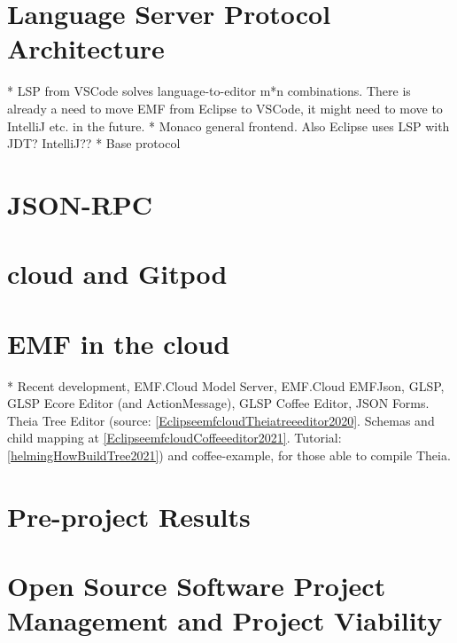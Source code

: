 \section{Language Server Protocol Architecture}\label{sec:lsp}
* LSP from VSCode solves language-to-editor m*n combinations. There is already a need to move EMF from Eclipse to VSCode, it might need to move to IntelliJ etc. in the future.
* Monaco general frontend. Also Eclipse uses LSP with JDT? IntelliJ??
* Base protocol \label{sec:base-protocol}

\section{JSON-RPC}

\section{\Gls{cloud} and \gls{Gitpod}}




\section{\acrlong{EMF} in the \Gls{cloud}}\label{sec:emf-in-cloud}
* Recent development, EMF.Cloud Model Server, EMF.Cloud EMFJson, GLSP, GLSP Ecore Editor (and ActionMessage\label{par:glsp-actionmessage}), GLSP Coffee Editor, JSON Forms.
Theia Tree Editor\label{par:theia-tree-editor} (source: \cref{EclipseemfcloudTheiatreeeditor2020}. Schemas and child mapping at \cref{EclipseemfcloudCoffeeeditor2021}. Tutorial: \cref{helmingHowBuildTree2021}) and coffee-example, for those able to compile Theia.

\section{Pre-project Results}




\section{Open Source Software Project Management and Project Viability}

